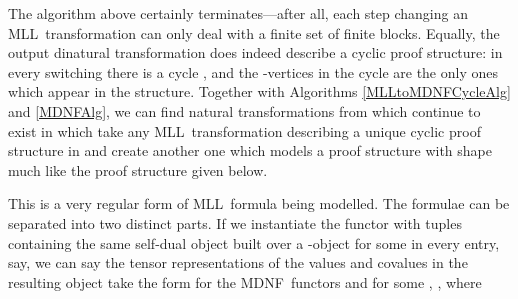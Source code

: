 \documentclass{LMCS}
\theoremstyle{plain}\newtheorem*{cLm}{Claim}
\newcommand{\mll}{MLL} \newcommand{\mall}{MALL}
\begin{document}
\noindent    The algorithm above certainly terminates---after all, each step changing an \mll~transformation can only deal with a finite set of finite blocks. Equally, the output dinatural transformation does indeed describe a cyclic proof structure: in every switching there is a cycle , and the -vertices in the cycle are the only ones which appear in the structure. Together with Algorithms \ref{MLLtoMDNFCycleAlg} and \ref{MDNFAlg}, we can find natural transformations from  which continue to exist in  which take any \mll~transformation describing a unique cyclic proof structure in  and create another one which models a proof structure with shape much like the proof structure given below.
    
    \begin{center} \label{MixCycleFigure} \vspace{5mm}
     \vspace{5mm}
    \end{center}
    
\noindent    This is a very regular form of \mll~formula being modelled. The formulae can be separated into two distinct parts. If we instantiate the functor with tuples containing the same self-dual object built over a -object  for some  in every entry,  say, we can say the tensor representations of the values and covalues in the resulting object take the form  for the MDNF~functors  and  for some , , where
    
\end{document}

